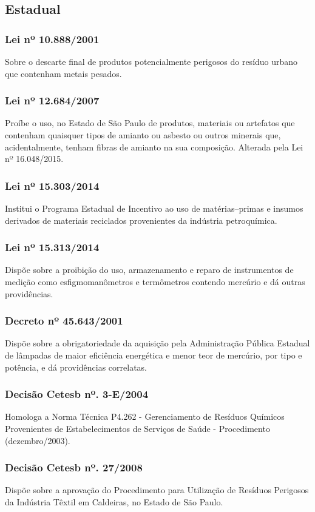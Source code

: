 \begin{subapend}
	\subsection{Estadual}
	\begin{subsubapend}
		\item \subsubsection{Lei nº 10.888/2001}
		Sobre o descarte final de produtos potencialmente perigosos do resíduo urbano que contenham metais pesados.
		\subsubsection{Lei nº 12.684/2007}
		Proíbe o uso, no Estado de São Paulo de produtos, materiais ou artefatos que contenham quaisquer tipos de amianto ou asbesto ou outros minerais que, acidentalmente, tenham fibras de amianto na sua composição. Alterada pela Lei nº 16.048/2015.
		\subsubsection{Lei nº 15.303/2014}
		Institui o Programa Estadual de Incentivo ao uso de matérias–primas e insumos derivados de materiais reciclados provenientes da indústria petroquímica.
		\subsubsection{Lei nº 15.313/2014}
		Dispõe sobre a proibição do uso, armazenamento e reparo de instrumentos de medição como esfigmomanômetros e termômetros contendo mercúrio e dá outras providências.
		\subsubsection{Decreto nº 45.643/2001}
		Dispõe sobre a obrigatoriedade da aquisição pela Administração Pública Estadual de lâmpadas de maior eficiência energética e menor teor de mercúrio, por tipo e potência, e dá providências correlatas.
		\subsubsection{Decisão Cetesb nº. 3-E/2004}
		Homologa a Norma Técnica P4.262 - Gerenciamento de Resíduos Químicos Provenientes de Estabelecimentos de Serviços de Saúde - Procedimento (dezembro/2003).
		\subsubsection{Decisão Cetesb nº. 27/2008}
		Dispõe sobre a aprovação do Procedimento para Utilização de Resíduos Perigosos da Indústria Têxtil em Caldeiras, no Estado de São Paulo.

\end{subsubapend}
\end{subapend}
